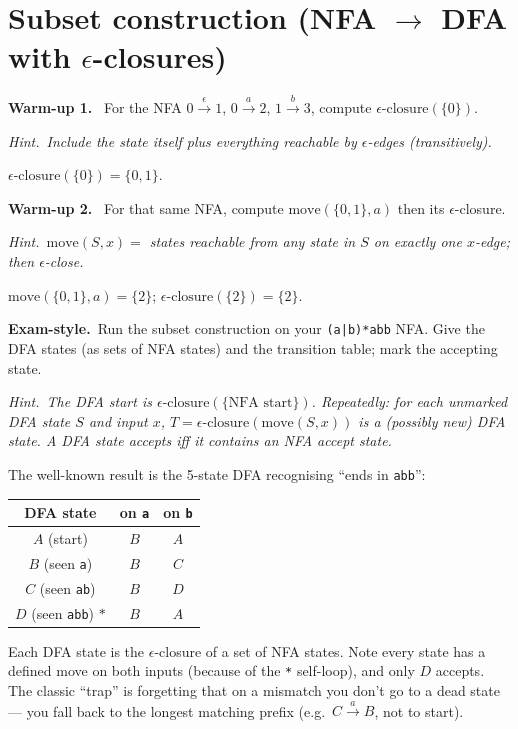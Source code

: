 \documentclass[11pt,a4paper]{article}
\newcommand{\hint}[1]{\par{\small\textcolor{accent}{\textit{Hint.}}\ \textit{#1}}\par\smallskip}
\newcommand{\warm}[1]{\smallskip\textbf{\textcolor{hi}{Warm-up #1.}}\ }
\newcommand{\exam}{\smallskip\textbf{\textcolor{warn}{Exam-style.}}\ }
\begin{document}
\section{Subset construction (NFA $\to$ DFA with $\epsilon$-closures)}

\warm{1} For the NFA $0\xrightarrow{\epsilon}1$, $0\xrightarrow{a}2$, $1\xrightarrow{b}3$, compute $\epsilon\text{-closure}(\{0\})$.
\hint{Include the state itself plus everything reachable by $\epsilon$-edges (transitively).}
\begin{sol}
$\epsilon\text{-closure}(\{0\})=\{0,1\}$.
\end{sol}

\warm{2} For that same NFA, compute $\mathrm{move}(\{0,1\},a)$ then its $\epsilon$-closure.
\hint{$\mathrm{move}(S,x)=$ states reachable from any state in $S$ on exactly one $x$-edge; then $\epsilon$-close.}
\begin{sol}
$\mathrm{move}(\{0,1\},a)=\{2\}$; $\epsilon\text{-closure}(\{2\})=\{2\}$.
\end{sol}

\exam Run the subset construction on your \texttt{(a|b)*abb} NFA. Give the DFA states (as sets of NFA states) and the transition table; mark the accepting state.
\hint{The DFA start is $\epsilon\text{-closure}(\{\text{NFA start}\})$. Repeatedly: for each unmarked DFA state $S$ and input $x$, $T=\epsilon\text{-closure}(\mathrm{move}(S,x))$ is a (possibly new) DFA state. A DFA state accepts iff it contains an NFA accept state.}
\begin{sol}
The well-known result is the 5-state DFA recognising ``ends in \texttt{abb}'':
\begin{center}
\begin{tabular}{c|cc}
DFA state & on \texttt{a} & on \texttt{b}\\\hline
$A$ (start) & $B$ & $A$\\
$B$ (seen \texttt{a}) & $B$ & $C$\\
$C$ (seen \texttt{ab}) & $B$ & $D$\\
$D$ (seen \texttt{abb}) $*$ & $B$ & $A$\\
\end{tabular}
\end{center}
Each DFA state is the $\epsilon$-closure of a set of NFA states. Note every state has a defined move on both inputs (because of the \texttt{*} self-loop), and only $D$ accepts. The classic ``trap'' is forgetting that on a mismatch you don't go to a dead state --- you fall back to the longest matching prefix (e.g.\ $C\xrightarrow{a}B$, not to start).
\end{sol}
\end{document}
